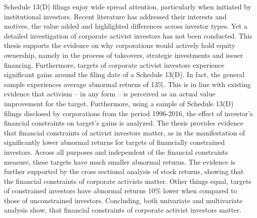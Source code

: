 \documentclass[12pt]{article}
\begin{document}
Schedule 13(D) filings enjoy wide spread attention, particularly when initiated by institutional investors. Recent literature has addressed their interests and motives, the value added and highlighted differences across investor types. Yet a detailed investigation of corporate activist investors has not been conducted. This thesis supports the evidence on why corporations would actively hold equity ownership, namely in the process of takeovers, strategic investments and issuer financing. Furthermore, targets of corporate activist investors experience significant gains around the filing date of a Schedule 13(D). In fact, the general sample experiences average abnormal returns of 13\%. This is in line with existing evidence that activism -- in any form -- is perceived as an actual value improvement for the target. 
Furthermore, using a sample of Schedule 13(D) filings disclosed by corporations from the period 1996-2016, the effect of investor's financial constraints on target's gains is analyzed. The thesis provides evidence that financial constraints of activist investors matter, as in the manifestation of significantly lower abnormal returns for targets of financially constrained investors. Across all purposes and independent of the financial constraints measure, these targets have much smaller abnormal returns. The evidence is further supported by the cross sectional analysis of stock returns, showing that the financial constraints of corporate activists matter. Other things equal, targets of constrained investors have abnormal returns 10\% lower when compared to those of unconstrained investors. Concluding, both univariate and multivariate analysis show, that financial constraints of corporate activist investors matter. 
\end{document}
